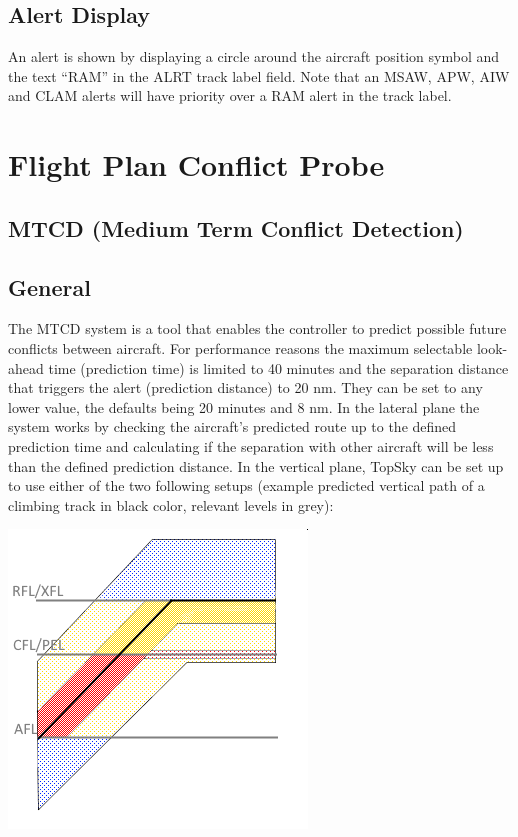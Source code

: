 \documentclass[11pt,a4paper]{memoir}
\begin{document}
\subsection*{Alert Display}

An alert is shown by displaying a circle around the aircraft position symbol and the text “RAM” in the ALRT track label field. Note that an MSAW, APW, AIW and CLAM alerts will have priority over a RAM alert in the track label.

\section{Flight Plan Conflict Probe}

\subsection{MTCD (Medium Term Conflict Detection)}

\subsection*{General}

The MTCD system is a tool that enables the controller to predict possible future conflicts between aircraft. For performance reasons the maximum selectable look-ahead time (prediction time) is limited to 40 minutes and the separation distance that triggers the alert (prediction distance) to 20 nm. They can be set to any lower value, the defaults being 20 minutes and 8 nm.
In the lateral plane the system works by checking the aircraft’s predicted route up to the defined prediction time and calculating if the separation with other aircraft will be less than the defined prediction distance.
In the vertical plane, TopSky can be set up to use either of the two following setups (example predicted vertical path of a climbing track in black color, relevant levels in grey):

\includegraphics{img/mtcdv.png}
\end{document}
